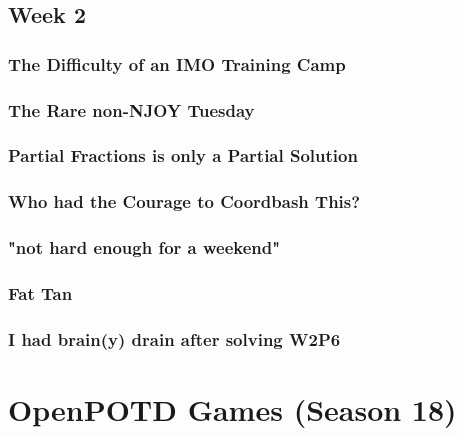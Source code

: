\documentclass[titlepage=true]{scrartcl}
\begin{document}
{    \subsection{Week 2}

    \subsubsection{The Difficulty of an IMO Training Camp}
    \label{17-2-1}
    
    \newpage

    \subsubsection{The Rare non-NJOY Tuesday}
	\label{17-2-2}
	
	\newpage

    \subsubsection{Partial Fractions is only a Partial Solution}
	\label{17-2-3}
	
	\newpage

    \subsubsection{Who had the Courage to Coordbash This?}
	\label{17-2-4}
	
	\newpage
	
	\subsubsection{"not hard enough for a weekend"}
	\label{17-2-5}
	
	\newpage

	\subsubsection{Fat Tan}
	\label{17-2-6}
	
	\newpage

    \subsubsection{I had brain(y) drain after solving W2P6}
	\label{17-2-7}
	
	\newpage

{
\section{OpenPOTD Games (Season 18)}

}}
\end{document}
